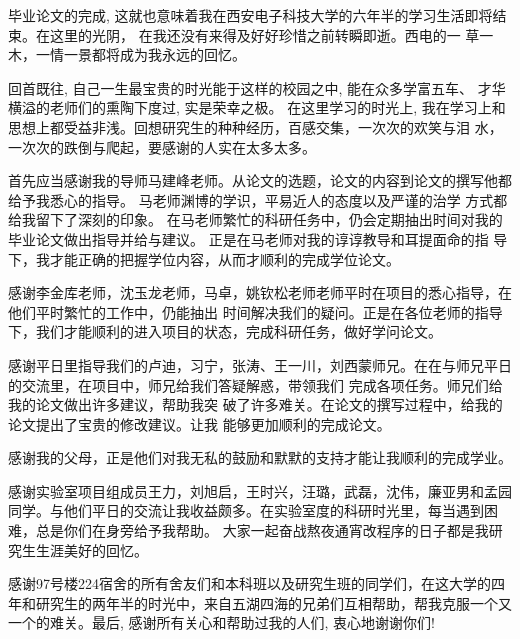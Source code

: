 
\begin{acknowledgments}

毕业论文的完成, 这就也意味着我在西安电子科技大学的六年半的学习生活即将结束。在这里的光阴，
在我还没有来得及好好珍惜之前转瞬即逝。西电的一 草一木，一情一景都将成为我永远的回忆。

回首既往, 自己一生最宝贵的时光能于这样的校园之中, 能在众多学富五车、 才华横溢的老师们的熏陶下度过, 实是荣幸之极。
在这里学习的时光上, 我在学习上和思想上都受益非浅。回想研究生的种种经历，百感交集，一次次的欢笑与泪 水，一次次的跌倒与爬起，要感谢的人实在太多太多。 
 
首先应当感谢我的导师马建峰老师。从论文的选题，论文的内容到论文的撰写他都给予我悉心的指导。
马老师渊博的学识，平易近人的态度以及严谨的治学 方式都给我留下了深刻的印象。
在马老师繁忙的科研任务中，仍会定期抽出时间对我的毕业论文做出指导并给与建议。
正是在马老师对我的谆谆教导和耳提面命的指 导下，我才能正确的把握学位内容，从而才顺利的完成学位论文。 

感谢李金库老师，沈玉龙老师，马卓，姚钦松老师老师平时在项目的悉心指导，在他们平时繁忙的工作中，仍能抽出
时间解决我们的疑问。正是在各位老师的指导下，我们才能顺利的进入项目的状态，完成科研任务，做好学问论文。
 
感谢平日里指导我们的卢迪，习宁，张涛、王一川，刘西蒙师兄。在在与师兄平日的交流里，在项目中，师兄给我们答疑解惑，带领我们
完成各项任务。师兄们给我的论文做出许多建议，帮助我突 破了许多难关。在论文的撰写过程中，给我的论文提出了宝贵的修改建议。让我 能够更加顺利的完成论文。 
 
感谢我的父母，正是他们对我无私的鼓励和默默的支持才能让我顺利的完成学业。
 
 感谢实验室项目组成员王力，刘旭启，王时兴，汪璐，武磊，沈伟，廉亚男和孟园同学。与他们平日的交流让我收益颇多。在实验室度的科研时光里，每当遇到困难，总是你们在身旁给予我帮助。
 大家一起奋战熬夜通宵改程序的日子都是我研究生生涯美好的回忆。 
  
 感谢97号楼224宿舍的所有舍友们和本科班以及研究生班的同学们，在这大学的四年和研究生的两年半的时光中，来自五湖四海的兄弟们互相帮助，帮我克服一个又一个的难关。最后, 感谢所有关心和帮助过我的人们, 衷心地谢谢你们!

\end{acknowledgments}



